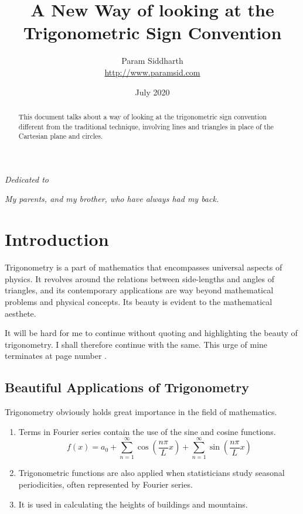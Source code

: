 \documentclass{article}
\title{A New Way of looking at the Trigonometric Sign Convention}
\author{Param Siddharth \\ \url{http://www.paramsid.com}}
\date{July 2020}
\begin{document}
\maketitle

    \begin{abstract}
        This document talks about a way of looking at the trigonometric sign convention different from the traditional technique, involving lines and triangles in place of the Cartesian plane and circles.
    \end{abstract}
    

\newpage \vspace*{8cm}
\thispagestyle{empty}
\begin{center}
    \large \emph{Dedicated to}
    
    \emph{My parents, and my brother, who have always had my back.}
\end{center}
\newpage

\tableofcontents
\newpage

\section{Introduction}

Trigonometry is a part of mathematics that encompasses universal aspects of physics. It revolves around the relations between side-lengths and angles of triangles, and its contemporary applications are way beyond mathematical problems and physical concepts. Its beauty is evident to the mathematical aesthete.

It will be hard for me to continue without quoting and highlighting the beauty of trigonometry. I shall therefore continue with the same. This urge of mine terminates at page number \pageref{tldr}.

\subsection{Beautiful Applications of Trigonometry}

Trigonometry obviously holds great importance in the field of mathematics.\autocite{Wiki:1}

\begin{enumerate}
    \item Terms in Fourier series contain the use of the sine and cosine functions.
    $$ f(x)=a_0+\sum_{n=1}^\infty \cos \left( \frac{n\pi}{L} x \right)+\sum_{n=1}^\infty \sin \left( \frac{n\pi}{L} x \right) $$
    \item Trigonometric functions are also applied when statisticians study seasonal periodicities, often represented by Fourier series.
    \item It is used in calculating the heights of buildings and mountains.
\end{enumerate}
\end{document}
